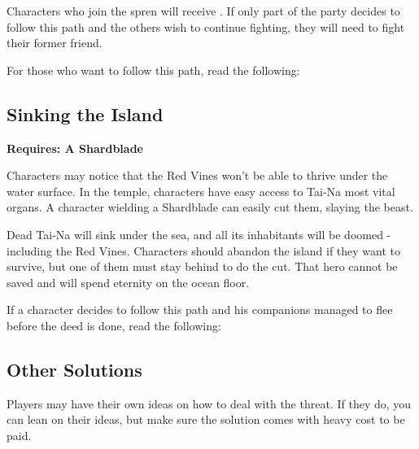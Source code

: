 Characters who join the spren will receive \textbf{\abilityVinesName[2]}. If only part of the party decides to follow this path and the others wish to continue fighting, they will need to fight their former friend. 

For those who want to follow this path, read the following:


\subsection{Sinking the Island}
\textbf{Requires: A Shardblade \\}

Characters may notice that the Red Vines won't be able to thrive under the water surface. In the temple, characters have easy access to Tai-Na most vital organs. A character wielding a Shardblade can easily cut them, slaying the beast. 

Dead Tai-Na will sink under the sea, and all its inhabitants will be doomed - including the Red Vines. Characters should abandon the island if they want to survive, but one of them must stay behind to do the cut. That hero cannot be saved and will spend eternity on the ocean floor.

If a character decides to follow this path and his companions managed to flee before the deed is done, read the following:


\subsection{Other Solutions}

Players may have their own ideas on how to deal with the threat. If they do, you can lean on their ideas, but make sure the solution comes with heavy cost to be paid.


